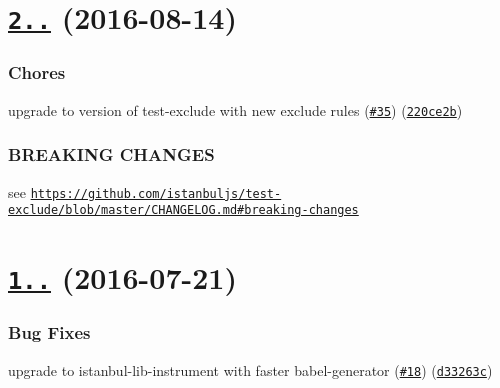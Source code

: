 \label{_2.0.0}%
 \section*{\href{https://github.com/istanbuljs/babel-plugin-istanbul/compare/v1.1.0...v2.0.0}{\tt 2..} (2016-\/08-\/14)}

\subsubsection*{Chores}


\begin{DoxyItemize}
\item upgrade to version of test-\/exclude with new exclude rules (\href{https://github.com/istanbuljs/babel-plugin-istanbul/issues/35}{\tt \#35}) (\href{https://github.com/istanbuljs/babel-plugin-istanbul/commit/220ce2b}{\tt 220ce2b})
\end{DoxyItemize}

\subsubsection*{B\+R\+E\+A\+K\+I\+NG C\+H\+A\+N\+G\+ES}


\begin{DoxyItemize}
\item see \href{https://github.com/istanbuljs/test-exclude/blob/master/CHANGELOG.md#breaking-changes}{\tt https\+://github.\+com/istanbuljs/test-\/exclude/blob/master/\+C\+H\+A\+N\+G\+E\+L\+O\+G.\+md\#breaking-\/changes}
\end{DoxyItemize}

\label{_1.1.0}%
 \section*{\href{https://github.com/istanbuljs/babel-plugin-istanbul/compare/v1.0.3...v1.1.0}{\tt 1..} (2016-\/07-\/21)}

\subsubsection*{Bug Fixes}


\begin{DoxyItemize}
\item upgrade to istanbul-\/lib-\/instrument with faster babel-\/generator (\href{https://github.com/istanbuljs/babel-plugin-istanbul/issues/18}{\tt \#18}) (\href{https://github.com/istanbuljs/babel-plugin-istanbul/commit/d33263c}{\tt d33263c})
\end{DoxyItemize}

